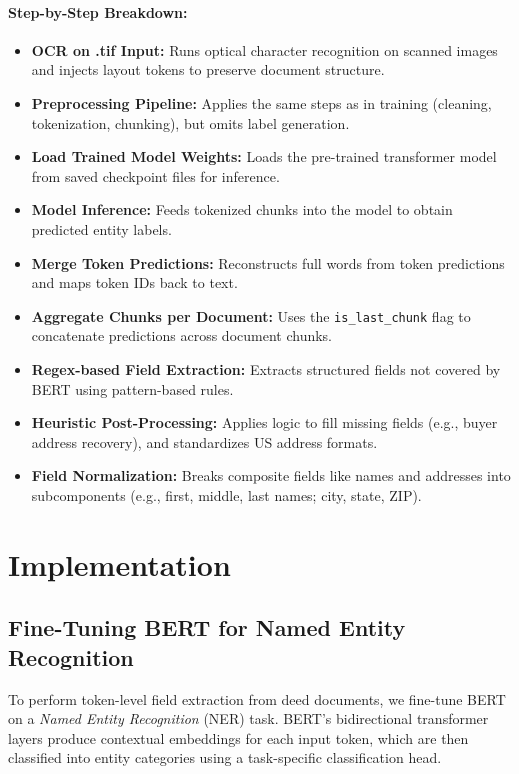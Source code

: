 \documentclass{article}
\begin{document}
\paragraph{Step-by-Step Breakdown:}
\begin{itemize}
    \item \textbf{OCR on .tif Input:} Runs optical character recognition on scanned images and injects layout tokens to preserve document structure.
    \item \textbf{Preprocessing Pipeline:} Applies the same steps as in training (cleaning, tokenization, chunking), but omits label generation.
    \item \textbf{Load Trained Model Weights:} Loads the pre-trained transformer model from saved checkpoint files for inference.
    \item \textbf{Model Inference:} Feeds tokenized chunks into the model to obtain predicted entity labels.
    \item \textbf{Merge Token Predictions:} Reconstructs full words from token predictions and maps token IDs back to text.
    \item \textbf{Aggregate Chunks per Document:} Uses the \texttt{is\_last\_chunk} flag to concatenate predictions across document chunks.
    \item \textbf{Regex-based Field Extraction:} Extracts structured fields not covered by BERT using pattern-based rules.
    \item \textbf{Heuristic Post-Processing:} Applies logic to fill missing fields (e.g., buyer address recovery), and standardizes US address formats.
    \item \textbf{Field Normalization:} Breaks composite fields like names and addresses into subcomponents (e.g., first, middle, last names; city, state, ZIP).
\end{itemize}


\section{Implementation}


\subsection{Fine-Tuning BERT for Named Entity Recognition}

To perform token-level field extraction from deed documents, we fine-tune BERT on a \emph{Named Entity Recognition} (NER) task. BERT's bidirectional transformer layers produce contextual embeddings for each input token, which are then classified into entity categories using a task-specific classification head.
\end{document}
